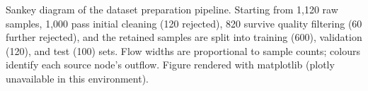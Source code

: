 \caption{Sankey diagram of the dataset preparation pipeline. Starting from 1{,}120 raw samples, 1{,}000 pass initial cleaning (120 rejected), 820 survive quality filtering (60 further rejected), and the retained samples are split into training (600), validation (120), and test (100) sets. Flow widths are proportional to sample counts; colours identify each source node's outflow. Figure rendered with matplotlib (plotly unavailable in this environment).}
